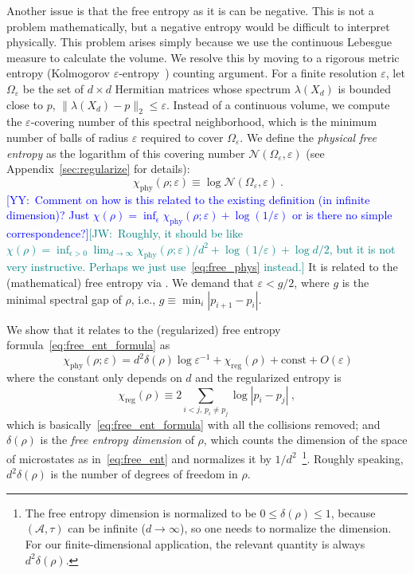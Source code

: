 \documentclass[aps,pre,twocolumn,superscriptaddress,amsmath,amssymb,reprint]{revtex4-2}
\def\eps{\varepsilon}
\def\A{\mathcal{A}}
\newcommand{\JW}[1]{\textcolor{teal}{[JW:\ #1]}}
\newcommand{\YY}[1]{\textcolor{blue}{[YY:\ #1]}}
\begin{document}
Another issue is that the free entropy as it is can be negative. This is not a problem mathematically, but a negative entropy would be difficult to interpret physically. This problem arises simply because we use the continuous Lebesgue measure to calculate the volume. We resolve this by moving to a rigorous metric entropy (Kolmogorov $\eps$-entropy~\cite{Kolmogorov1963,KolmogorovTikhomirov1961}) counting argument. For a finite resolution $\eps$, let $\Omega_\eps$ be the set of $d\times d$ Hermitian matrices whose spectrum $\lambda(X_d)$ is bounded close to $p$, $\| \lambda(X_d) - p \|_2 \le \eps$. Instead of a continuous volume, we compute the $\eps$-covering number of this spectral neighborhood, which is the minimum number of balls of radius $\eps$ required to cover $\Omega_\eps$. We define the \emph{physical free entropy} as the logarithm of this covering number $\mathcal{N}(\Omega_\eps, \eps)$ (see Appendix~\ref{sec:regularize} for details):
\begin{equation}~\label{eq:free_phys_def}
    \chi_\mathrm{phy}(\rho;\eps) \equiv \log \mathcal{N}(\Omega_\eps, \eps)\ .
\end{equation}
\YY{Comment on how is this related to the existing definition (in infinite dimension)? Just $\chi(\rho)=\inf_{\epsilon}\chi_\mathrm{phy}(\rho;\eps)+\log(1/\eps)$ or is there no simple correspondence?}\JW{Roughly, it should be like $\chi(\rho)=\inf_{\epsilon>0}\lim_{d\to\infty}\chi_\mathrm{phy}(\rho;\eps)/d^2+\log(1/\eps)+\log d/2$, but it is not very instructive. Perhaps we just use~\eqref{eq:free_phys} instead.} It is related to the (mathematical) free entropy via .
We demand that $\eps<g/2$, where $g$ is the minimal spectral gap of $\rho$, i.e., $g\equiv\min_{i}|p_{i+1}-p_i|$.

We show that it relates to the (regularized) free entropy formula~\eqref{eq:free_ent_formula} as
\begin{equation}~\label{eq:free_phys}
    \chi_\mathrm{phy}(\rho;\eps)= d^2\delta(\rho)\log\eps^{-1} +\chi_\mathrm{reg}(\rho) + \mathrm{const} + O(\eps)
\end{equation}
where the constant only depends on $d$ and the regularized entropy is 
\begin{equation}
    \chi_\mathrm{reg}(\rho) \equiv 2\sum_{i< j,\, p_i\neq p_j} \log|p_i-p_j|\ ,\label{eq:reg_free_ent}
\end{equation}
which is basically~\eqref{eq:free_ent_formula} with all the collisions removed; and $\delta(\rho)$ is the \emph{free entropy dimension} of $\rho$, which counts the dimension of the space of microstates as in~\eqref{eq:free_ent} and normalizes it by $1/d^2$~\footnote{The free entropy dimension is normalized to be $0\leq\delta(\rho)\leq 1$, because $(\A,\tau)$ can be infinite ($d\to\infty$), so one needs to normalize the dimension. For our finite-dimensional application, the relevant quantity is always $d^2\delta(\rho)$.}. Roughly speaking, $d^2\delta(\rho)$ is the number of degrees of freedom in $\rho$.
\end{document}
